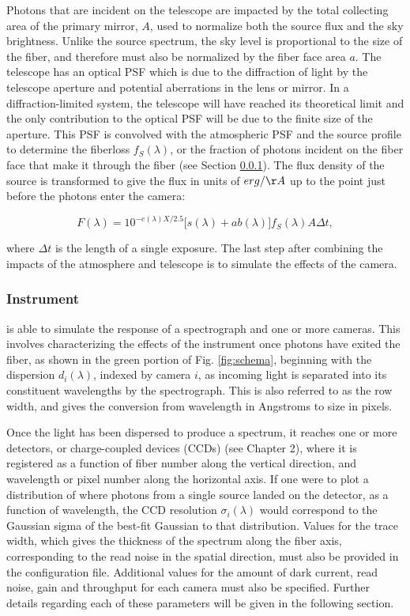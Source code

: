 Photons that are incident on the telescope are impacted by the total collecting area of the primary mirror, $A$, used to normalize both the source flux and the sky brightness. Unlike the source spectrum, the sky level is proportional to the size of the fiber, and therefore must also be normalized by the fiber face area $a$. The telescope has an optical PSF which is due to the diffraction of light by the telescope aperture and potential aberrations in the lens or mirror. In a diffraction-limited system, the telescope will have reached its theoretical limit and the only contribution to the optical PSF will be due to the finite size of the aperture. This PSF is convolved with the atmospheric PSF and the source profile to determine the fiberloss $f_{S}(\lambda)$, or the fraction of photons incident on the fiber face that make it through the fiber (see Section \ref{sec:instrument}). The flux density of the source is transformed to give the flux in units of $erg / \AA$ up to the point just before the photons enter the camera: 

\begin{equation}
    F(\lambda) = 10^{-e(\lambda)X/2.5}\Big[s(\lambda) + ab(\lambda)\Big]f_{S}(\lambda)A\Delta t,
\label{eq:flux}
\end{equation}

where $\Delta t$ is the length of a single exposure. The last step after combining the impacts of the atmosphere and telescope is to simulate the effects of the camera.

\subsubsection{Instrument}
\label{sec:instrument}
 is able to simulate the response of a spectrograph and one or more cameras. This involves characterizing the effects of the instrument once photons have exited the fiber, as shown in the green portion of Fig. \ref{fig:schema}, beginning with the dispersion $d_{i}(\lambda)$, indexed by camera $i$, as incoming light is separated into its constituent wavelengths by the spectrograph. This is also referred to as the row width, and gives the conversion from wavelength in Angstroms to size in pixels.

Once the light has been dispersed to produce a spectrum, it reaches one or more detectors, or charge-coupled devices (CCDs) (see Chapter 2), where it is registered as a function of fiber number along the vertical direction, and wavelength or pixel number along the horizontal axis. If one were to plot a distribution of where photons from a single source landed on the detector, as a function of wavelength, the CCD resolution $\sigma_{i}(\lambda)$ would correspond to the Gaussian sigma of the best-fit Gaussian to that distribution. Values for the trace width, which gives the thickness of the spectrum along the fiber axis, corresponding to the read noise in the spatial direction, must also be provided in the configuration file. Additional values for the amount of dark current, read noise, gain and throughput for each camera must also be specified. Further details regarding each of these parameters will be given in the following section.

